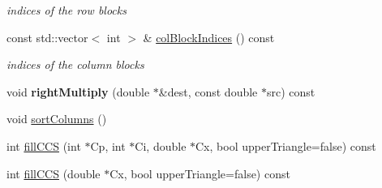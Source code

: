 \begin{DoxyCompactItemize}
\begin{DoxyCompactList}\small\item\em indices of the row blocks \end{DoxyCompactList}\item 
\hypertarget{classg2o_1_1SparseBlockMatrixCCS_af36057337dbc4376e44f74baaf18992a}{const std\-::vector$<$ int $>$ \& \hyperlink{classg2o_1_1SparseBlockMatrixCCS_af36057337dbc4376e44f74baaf18992a}{col\-Block\-Indices} () const }\label{classg2o_1_1SparseBlockMatrixCCS_af36057337dbc4376e44f74baaf18992a}

\begin{DoxyCompactList}\small\item\em indices of the column blocks \end{DoxyCompactList}\item 
\hypertarget{classg2o_1_1SparseBlockMatrixCCS_a6d9393fa3950a7cefc7f9ca58ccede64}{void {\bfseries right\-Multiply} (double $\ast$\&dest, const double $\ast$src) const }\label{classg2o_1_1SparseBlockMatrixCCS_a6d9393fa3950a7cefc7f9ca58ccede64}

\item 
void \hyperlink{classg2o_1_1SparseBlockMatrixCCS_a6500e67cc29b3fe51bc40930d97d0ac5}{sort\-Columns} ()
\item 
int \hyperlink{classg2o_1_1SparseBlockMatrixCCS_a6dfde3d314a5334c850ab825df8de77a}{fill\-C\-C\-S} (int $\ast$Cp, int $\ast$Ci, double $\ast$Cx, bool upper\-Triangle=false) const 
\item 
int \hyperlink{classg2o_1_1SparseBlockMatrixCCS_adab44f6a330393be5f593659a5e7c7bd}{fill\-C\-C\-S} (double $\ast$Cx, bool upper\-Triangle=false) const 
\end{DoxyCompactItemize}
